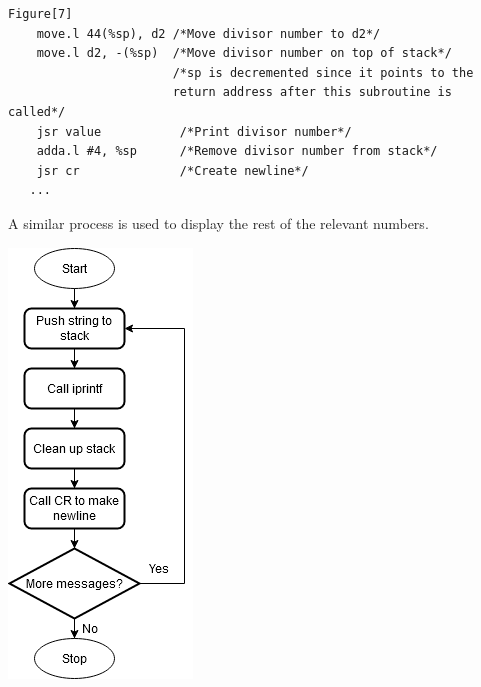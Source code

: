 \documentclass[12pt]{article}
\begin{document}
\begin{verbatim}
Figure[7]
    move.l 44(%sp), d2 /*Move divisor number to d2*/
    move.l d2, -(%sp)  /*Move divisor number on top of stack*/
                       /*sp is decremented since it points to the
                       return address after this subroutine is called*/
    jsr value           /*Print divisor number*/
    adda.l #4, %sp      /*Remove divisor number from stack*/
    jsr cr              /*Create newline*/
   ...
\end{verbatim}

A similar process is used to display the rest of the relevant numbers.

\begin{center}
\includegraphics[scale = 0.5]{./PartC.PNG}
\end{center}
\end{document}
